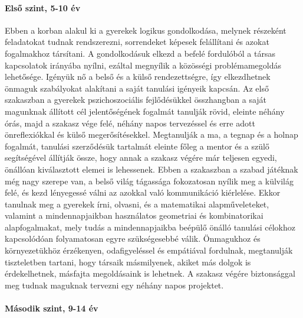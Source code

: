 \paragraph{Első szint, 5-10 év }

Ebben a korban alakul ki a gyerekek logikus gondolkodása, melynek részeként feladatokat tudnak rendszerezni, sorrendeket képesek felállítani és azokat fogalmakhoz társítani. A gondolkodásuk elkezd a befelé fordulóból a társas kapcsolatok irányába nyílni, ezáltal megnyílik a közösségi problémamegoldás lehetősége. Igényük nő a belső és a külső rendezettségre, így elkezdhetnek önmaguk szabályokat alakítani a saját tanulási igényeik kapcsán. 
Az első szakaszban a gyerekek pszichoszociális fejlődésükkel összhangban a saját magunknak állított cél jelentőségének fogalmát tanulják rövid, eleinte néhány órás, majd a szakasz vége felé, néhány napos tervezéssel és erre adott önreflexiókkal és külső megerősítésekkel. Megtanulják a ma, a tegnap és a holnap fogalmát, tanulási szerződésük tartalmát eleinte főleg a mentor és a szülő segítségével állítják össze, hogy annak a szakasz végére már teljesen egyedi, önállóan kiválasztott elemei is lehessenek.
Ebben a szakaszban a szabad játéknak még nagy szerepe van, a belső világ tágassága fokozatosan nyílik meg a külvilág felé, és kezd lényegessé válni az azokkal való kommunikáció kiérlelése.
Ekkor tanulnak meg a gyerekek írni, olvasni, és a matematikai alapműveleteket, valamint a mindennapjaikban használatos  geometriai és kombinatorikai alapfogalmakat, mely tudás a mindennapjaikba beépülő önálló tanulási célokhoz kapcsolódóan folyamatosan egyre szükségesebbé válik. Önmagukhoz és környezetükhöz érzékenyen, odafigyeléssel és empátiával fordulnak, megtanulják tiszteletben tartani, hogy társaik másmilyenek, akiket más dolgok is érdekelhetnek, másfajta megoldásaink is lehetnek.
A szakasz végére biztonsággal meg tudnak maguknak tervezni egy néhány napos  projektet.

\paragraph{Második szint, 9-14 év}

